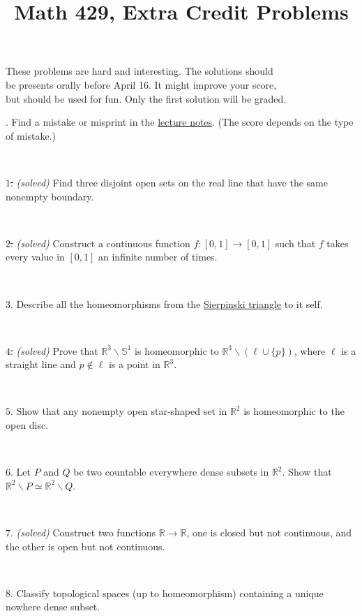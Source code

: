 \documentclass{article}
\def\noi{\noindent}%
\def\RR{\mathbb{R}}%
\def\:{\colon}
\begin{document}
\title{Math 429, Extra Credit Problems}
\author{}
\date{}
\maketitle

\begin{center}
{\small These problems are hard and interesting.
The solutions should \\
be presents orally before April 16.
It might improve your score,\\
but should be used for fun. Only the first solution will be graded.}
\end{center}
\thispagestyle{empty}


\noi 0. Find a mistake or misprint in the \href{https://anton-petrunin.github.io/topology/book.pdf}{lecture notes}.
(The score depends on the type of mistake.)

\ 

\noi \sout{$1$.} \textit{(solved)}
Find three disjoint open sets on the real line 
that have the same nonempty boundary. 

\ 

\noi \sout{$2$.} \textit{(solved)} Construct a continuous function 
$f\:[0,1]\rightarrow [0,1]$ such that $f$ takes every value in $[0,1]$ 
an infinite number of times.

\ 

\noi $3$.
Describe all the homeomorphisms from the \href{http://en.wikipedia.org/wiki/Sierpinski_triangle}{Sierpinski triangle} to it self.

\ 

\noi \sout{$4$.} \textit{(solved)} Prove that $\RR^3\backslash \mathbb{S}^1$ is homeomorphic to $\RR^3\backslash (\ell\cup \{p\})$, where $\ell$ is a straight line and $p\not\in\ell$ is a point in $\RR^3$.


\ 


\noi $5$. Show that any nonempty open star-shaped set in $\RR^2$ is homeomorphic to the open disc.

\ 

\noi $6$. Let $P$ and $Q$ be two countable everywhere dense subsets in $\RR^2$.
Show that $\RR^2\backslash P\simeq\RR^2\backslash Q$.

\ 

\noi \sout{$7.$} \textit{(solved)}
Construct two functions $\RR\to\RR$, one is closed but not continuous, and the other is open but not continuous.


\ 

\noi $8.$
Classify topological spaces (up to homeomorphism) containing a unique nowhere dense subset.
\end{document}
